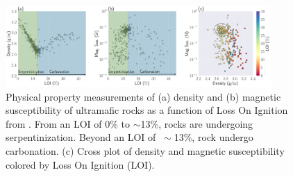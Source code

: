 \begin{figure}[!htb]
    \begin{center}
    \includegraphics[width=0.9\textwidth]{figures/phys-props-loi.png}
    \end{center}
\caption{
    Physical property measurements of (a) density and (b) magnetic susceptibility of ultramafic rocks as a function of Loss On Ignition from \cite{Cutts2021}. From an LOI of 0\% to $\sim$13\%, rocks are undergoing serpentinization. Beyond an LOI of $~\sim$13\%, rock undergo carbonation. (c) Cross plot of density and magnetic susceptibility colored by Loss On Ignition (LOI).
}
\label{fig:phys-props-loi}
\end{figure}
